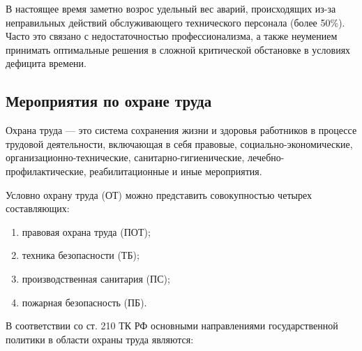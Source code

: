 В настоящее время заметно возрос удельный вес аварий, происходящих из-за неправильных действий обслуживающего технического персонала (более 50\%). Часто это связано с недостаточностью профессионализма, а также неумением принимать оптимальные решения в сложной критической обстановке в условиях дефицита времени.


\subsection{Мероприятия по охране труда}

Охрана труда --- это система сохранения жизни и здоровья работников в процессе трудовой деятельности, включающая в себя правовые, социально-экономические, организационно-технические, санитарно-гигиенические, лечебно-профилактические, реабилитационные и иные мероприятия.

Условно охрану труда (ОТ) можно представить совокупностью четырех составляющих:

\begin{enumerate}[1.]
	\item правовая охрана труда (ПОТ);
	\item техника безопасности (ТБ);
	\item производственная санитария (ПС);
	\item пожарная безопасность (ПБ).
\end{enumerate}

В соответствии со ст. 210 ТК РФ основными направлениями государственной политики в области охраны труда являются:

